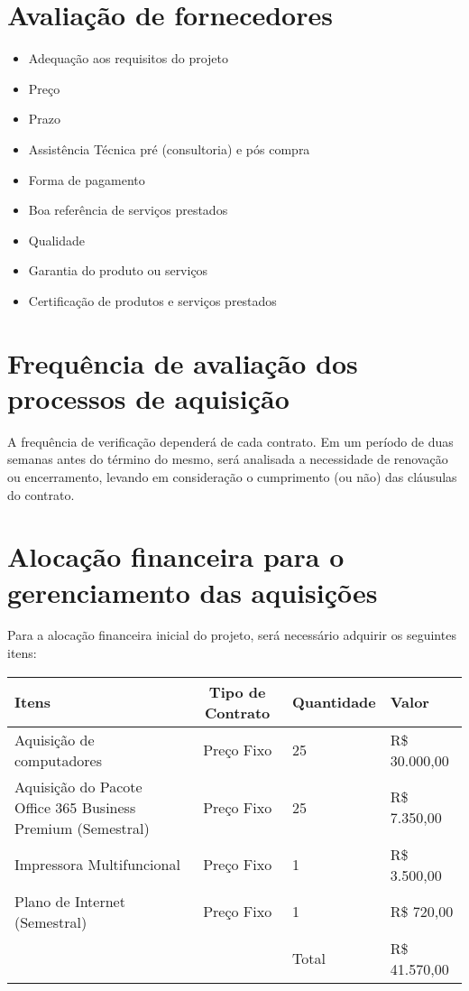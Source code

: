 \section{Avaliação de fornecedores}
\begin{itemize}
\item Adequação aos requisitos do projeto
\item Preço
\item Prazo
\item Assistência Técnica pré (consultoria) e pós compra
\item Forma de pagamento
\item Boa referência de serviços prestados
\item Qualidade
\item Garantia do produto ou serviços
\item Certificação de produtos e serviços prestados
\end{itemize}

\section{Frequência de avaliação dos processos de aquisição}
A frequência de verificação dependerá de cada contrato. Em um período de duas semanas antes do término do mesmo, será analisada a necessidade de renovação ou encerramento, levando em consideração o cumprimento (ou não) das cláusulas do contrato.

\section{Alocação financeira para o gerenciamento das aquisições}
Para a alocação financeira  inicial do projeto, será necessário adquirir os seguintes itens:
\begin{table}[h]
\centering
\begin{tabular}{|p{7cm}|c|p{2cm}|p{2.5cm}|}
Itens & Tipo de Contrato & Quantidade & Valor\\
\hline
Aquisição de computadores & Preço Fixo	& 25 & R\$ 30.000,00 \\
\hline
Aquisição do Pacote Office 365 Business Premium (Semestral)	& Preço Fixo & 25 & R\$ 7.350,00\\
\hline
Impressora Multifuncional & Preço Fixo & 1 & R\$ 3.500,00\\
\hline
Plano de Internet (Semestral) & Preço Fixo & 1 & R\$ 720,00\\
\hline
 & & Total & R\$ 41.570,00
\end{tabular}
\end{table}

